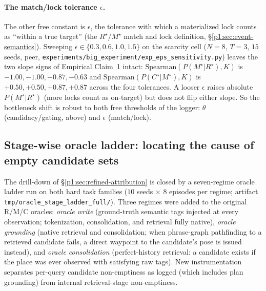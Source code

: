 \documentclass{article}
\newcommand{\method}[1]{\texttt{#1}}
\begin{document}
\paragraph{The match/lock tolerance $\epsilon$.} The other free constant is
$\epsilon$, the tolerance with which a materialized lock counts as ``within a
true target'' (the $R^\star$/$M^\star$ match and lock definition, \S\ref{p1:sec:event-semantics}).
Sweeping $\epsilon\in\{0.3,0.6,1.0,1.5\}$ on the scarcity cell ($N{=}8$, $T{=}3$,
$15$ seeds, peer, \method{experiments/big\_experiment/exp\_eps\_sensitivity.py})
leaves the two slope signs of Empirical Claim~1 intact: $\mathrm{Spearman}(P(M^\star|R^\star),K)$
is $-1.00,-1.00,-0.87,-0.63$ and $\mathrm{Spearman}(P(C^\star|M^\star),K)$ is
$+0.50,+0.50,+0.87,+0.87$ across the four tolerances. A looser $\epsilon$ raises
absolute $P(M^\star|R^\star)$ (more locks count as on-target) but does not flip
either slope. So the bottleneck shift is robust to both free thresholds of the
logger: $\theta$ (candidacy/gating, above) and $\epsilon$ (match/lock).

\subsection{Stage-wise oracle ladder: locating the cause of empty candidate sets}
\label{p1:app:oracle-ladder}

The drill-down of \S\ref{p1:sec:refined-attribution} is closed by a
seven-regime oracle ladder run on both hard task families ($10$ seeds
$\times$ $8$ episodes per regime; artifact
\texttt{tmp/oracle\_stage\_ladder\_full/}). Three regimes were added
to the original R/M/C oracles: \emph{oracle write} (ground-truth
semantic tags injected at every observation; tokenization,
consolidation, and retrieval fully native), \emph{oracle grounding}
(native retrieval and consolidation; when phrase-graph pathfinding to
a retrieved candidate fails, a direct waypoint to the candidate's
pose is issued instead), and \emph{oracle consolidation}
(perfect-history retrieval: a candidate exists if the place was ever
observed with satisfying raw tags). New instrumentation separates
per-query candidate non-emptiness as logged (which includes plan
grounding) from internal retrieval-stage non-emptiness.
\end{document}
